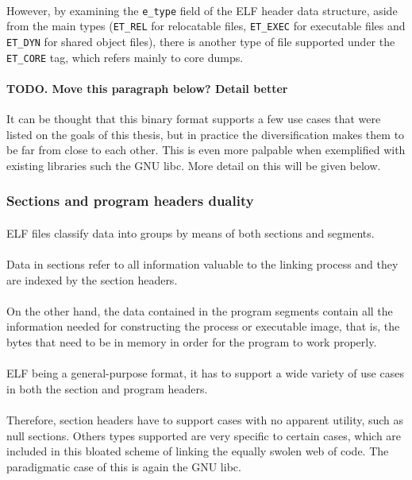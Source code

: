 \documentclass[12pt]{article}
\begin{document}
	\paragraph{}However, by examining the \verb|e_type| field of the ELF header data structure, aside from the main types (\verb|ET_REL| for relocatable files, \verb|ET_EXEC| for executable files and \verb|ET_DYN| for shared object files), there is another type of file supported under the \verb|ET_CORE| tag, which refers mainly to core dumps.
	\paragraph{TODO. Move this paragraph below? Detail better}It can be thought that this binary format supports a few use cases that were listed on the goals of this thesis, but in practice the diversification makes them to be far from close to each other. This is even more palpable when exemplified with existing libraries such the GNU libc. More detail on this will be given below.
	
	\subsubsection{Sections and program headers duality}
	
	\paragraph{}ELF files classify data into groups by means of both sections and segments. \paragraph{}Data in sections refer to all information valuable to the linking process and they are indexed by the section headers.
	\paragraph{}On the other hand, the data contained in the program segments contain all the information needed for constructing the process or executable image, that is, the bytes that need to be in memory in order for the program to work properly.
	\paragraph{}ELF being a general-purpose format, it has to support a wide variety of use cases in both the section and program headers.
	\paragraph{}Therefore, section headers have to support cases with no apparent utility, such as null sections. Others types supported are very specific to certain cases, which are included in this bloated scheme of linking the equally swolen web of code. The paradigmatic case of this is again the GNU libc.
\end{document}
